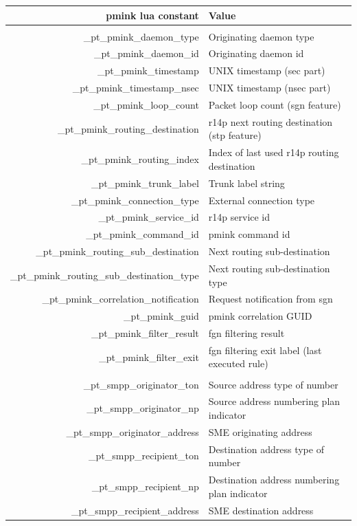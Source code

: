 \documentclass[a4paper,latin]{paper}
\begin{document}
\noindent
\begin{tabularx}{\linewidth}{ | >{\ttfamily} r | >{\ttfamily} X |}
	\hline
	\acrshort{pmink} \gls{lua} constant			& Value \\
	\hline
	\rowcolor{blue!10}
	\multicolumn{2}{| l |}{\acrfull{pmink}}			\\
	\hline
	\_pt\_pmink\_daemon\_type				& Originating daemon type \\ 
	\_pt\_pmink\_daemon\_id					& Originating daemon id \\ 
	\_pt\_pmink\_timestamp					& UNIX timestamp (sec part) \\
	\_pt\_pmink\_timestamp\_nsec				& UNIX timestamp (nsec part) \\
	\_pt\_pmink\_loop\_count				& Packet loop count (\acrshort{sgn} feature) \\
	\_pt\_pmink\_routing\_destination			& \acrshort{r14p} next routing destination (\acrshort{stp} feature) \\
	\_pt\_pmink\_routing\_index				& Index of last used \acrshort{r14p} routing destination \\
	\_pt\_pmink\_trunk\_label				& Trunk label string \\
	\_pt\_pmink\_connection\_type				& External connection type \\
	\_pt\_pmink\_service\_id				& \acrshort{r14p} service id \\
	\_pt\_pmink\_command\_id				& \acrshort{pmink} command id \\
	\_pt\_pmink\_routing\_sub\_destination			& Next routing sub-destination \\
	\_pt\_pmink\_routing\_sub\_destination\_type		& Next routing sub-destination type \\
	\_pt\_pmink\_correlation\_notification			& Request notification from \acrshort{sgn} \\
	\_pt\_pmink\_guid					& \acrshort{pmink} correlation GUID \\
	\_pt\_pmink\_filter\_result				& \acrshort{fgn} filtering result \\
	\_pt\_pmink\_filter\_exit				& \acrshort{fgn} filtering exit label (last executed rule) \\
	\hline
	\rowcolor{blue!10}
	\multicolumn{2}{| l |}{\acrfull{smpp}} 			\\
	\hline
	\_pt\_smpp\_originator\_ton				& Source address type of number \\
	\_pt\_smpp\_originator\_np				& Source address numbering plan indicator\\
	\_pt\_smpp\_originator\_address				& SME originating address \\
	\_pt\_smpp\_recipient\_ton				& Destination address type of number\\
	\_pt\_smpp\_recipient\_np				& Destination address numbering plan indicator \\
	\_pt\_smpp\_recipient\_address				& SME destination address \\
	\hline
\end{tabularx}%
\clearpage
\end{document}
